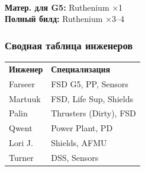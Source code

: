 \begin{tcolorbox}[edbox-titled, title=6.~BILL TURNER]
\\
\\
\\[1mm]
\edrule
{\color{edorange}\fontsize{6.5}{8}\selectfont\bfseries Матер. для G5:}
{\fontsize{7}{8.5}\selectfont Ruthenium ×1}\\
{\color{edorange}\fontsize{6.5}{8}\selectfont\bfseries Полный билд:}
{\fontsize{7}{8.5}\selectfont Ruthenium ×3--4}
\end{tcolorbox}

\edsep

\subsubsection{Сводная таблица инженеров}

\begin{tabular}{p{20mm}p{40mm}}
\rowcolor{edheaderbg}
{\color{edorange}\fontsize{6.5}{8}\selectfont\bfseries Инженер} &
{\color{edorange}\fontsize{6.5}{8}\selectfont\bfseries Специализация}\\
\rowcolor{edtablebg}
{\fontsize{6.5}{8}\selectfont Farseer} &
{\color{edgraytext}\fontsize{6.5}{8}\selectfont FSD G5, PP, Sensors}\\
\rowcolor{edtablealt}
{\fontsize{6.5}{8}\selectfont Martuuk} &
{\color{edgraytext}\fontsize{6.5}{8}\selectfont FSD, Life Sup, Shields}\\
\rowcolor{edtablebg}
{\fontsize{6.5}{8}\selectfont Palin} &
{\color{edgraytext}\fontsize{6.5}{8}\selectfont Thrusters (Dirty), FSD}\\
\rowcolor{edtablealt}
{\fontsize{6.5}{8}\selectfont Qwent} &
{\color{edgraytext}\fontsize{6.5}{8}\selectfont Power Plant, PD}\\
\rowcolor{edtablebg}
{\fontsize{6.5}{8}\selectfont Lori J.} &
{\color{edgraytext}\fontsize{6.5}{8}\selectfont Shields, AFMU}\\
\rowcolor{edtablealt}
{\fontsize{6.5}{8}\selectfont Turner} &
{\color{edgraytext}\fontsize{6.5}{8}\selectfont DSS, Sensors}\\
\end{tabular}
